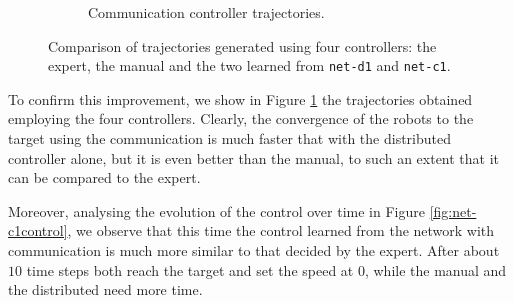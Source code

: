 \begin{figure}[H]
\begin{center}
\begin{subfigure}[h]{0.49\textwidth}
			\caption{Communication controller trajectories.}
		\end{subfigure}
	\end{center}
	\vspace{-0.5cm}
	\caption[Evaluation of the trajectories learned by \texttt{net-c1}.]{Comparison 
	of trajectories generated using four controllers: the expert, the manual and the 
	two learned from \texttt{net-d1} and \texttt{net-c1}.}
	\label{fig:net-c1traj}
\end{figure}

To confirm this improvement, we show in Figure \ref{fig:net-c1traj} the 
trajectories obtained employing the four controllers. 
Clearly, the convergence of the robots to the target using the communication is 
much faster that with the distributed controller alone, but it is even better than 
the manual, to such an extent that it can be compared to the expert.

Moreover, analysing the evolution of the control over time in Figure 
\ref{fig:net-c1control}, we observe that this time the control learned from the 
network with communication is much more similar to that decided by the expert.
After about $10$ time steps both reach the target and set the speed at $0$, while 
the manual and the distributed need more time.

